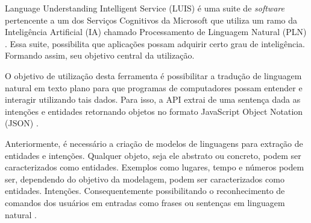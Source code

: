 Language Understanding Intelligent Service (LUIS) é uma suite de \textit{software} pertencente a um dos Serviços Cognitivos da Microsoft que utiliza um ramo da Inteligência Artificial (IA) chamado Processamento de Linguagem Natural (PLN) \cite{Mayo:2017}. Essa suite, possibilita que aplicações possam adquirir certo grau de inteligência. Formando assim, seu objetivo central da utilização.

O objetivo de utilização desta ferramenta é possibilitar a tradução de linguagem natural em texto plano para que programas de computadores possam entender e interagir utilizando tais dados. Para isso, a API extrai de uma sentença dada as intenções e entidades retornando objetos no formato JavaScript Object Notation (JSON) \cite{Mayo:2017}.

Anteriormente, é necessário a criação de modelos de linguagens para extração de entidades e intenções. Qualquer objeto, seja ele abstrato ou concreto, podem ser caracterizados como entidades. Exemplos como lugares, tempo e números podem ser, dependendo do objetivo da modelagem, podem ser caracterizados como entidades. Intenções.  Consequentemente possibilitando o reconhecimento de comandos dos usuários em entradas como frases ou sentenças em linguagem natural \cite{Larsen:2017}.
